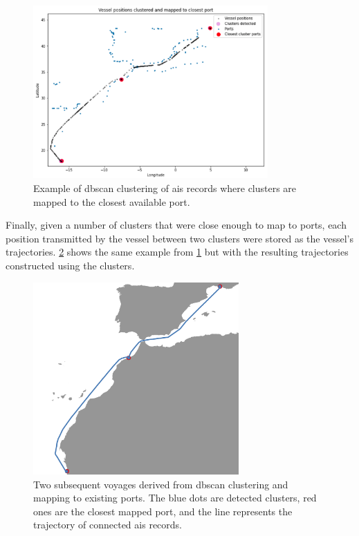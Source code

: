 \begin{figure}[htbp]
    \centering
    \includegraphics[width=0.8\textwidth]{figures/dbscan/clustering}
    \caption{Example of \acrshort{dbscan} clustering of \acrshort{ais} records where clusters are mapped to the closest available port.}
    \label{fig:dbscan_clustering}
\end{figure}

Finally, given a number of clusters that were close enough to map to ports, each position transmitted by the vessel between two clusters were stored as the vessel's trajectories. \cref{fig:clustered_trajectories} shows the same example from \cref{fig:dbscan_clustering} but with the resulting trajectories constructed using the clusters.

\begin{figure}[htbp]
    \centering
    \includegraphics[width=0.7\textwidth]{figures/dbscan/cluster_voyage}
    \caption{Two subsequent voyages derived from \acrshort{dbscan} clustering and mapping to existing ports. The blue dots are detected clusters, red ones are the closest mapped port, and the line represents the trajectory of connected \acrshort{ais} records.}
    \label{fig:clustered_trajectories}
\end{figure}

